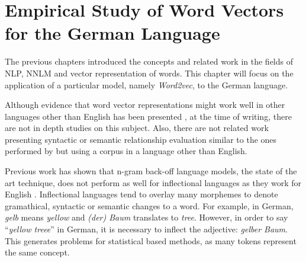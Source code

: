 \chapter{Empirical Study of Word Vectors for the German Language}
\label{chapter:wor2vec_german}











The previous chapters introduced the concepts and related work  in the fields
of  \ac{NLP}, \ac{NNLM} and vector representation of words. This chapter will
focus on the application of a particular model, namely \textit{Word2vec}, to
the German language.  


Although  evidence that word vector representations might work
well in other languages other than English has been presented
\cite{DBLP:journals/corr/MikolovLS13}, at the time of writing, there are not
in depth studies on this subject.  Also, there are not related work  presenting syntactic or
semantic relationship evaluation similar to the
ones performed by \cite{DBLP:journals/corr/abs-1301-3781} but using a corpus
in a language other than English. 

Previous work has shown that  n-gram back-off language models, the state of the art
technique, does not perform  as well for inflectional languages as they work
for English \cite{conf/icassp/MikolovKBGC09}. Inflectional languages tend to
overlay many morphemes to denote gramathical, syntactic or 
semantic changes to a word. For example, in German, \textit{gelb} means
\textit{yellow} and \textit{(der) Baum} translates to \textit{tree}. However, in
order to say ``\textit{yellow treee}'' in German, it is necessary to inflect the
adjective: \textit{gelber Baum}. This generates problems for statistical
based methods, as many tokens represent the same concept.

